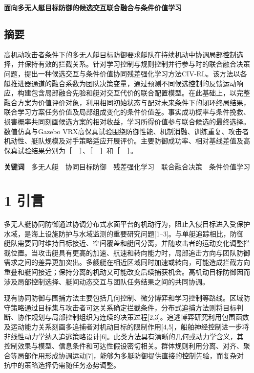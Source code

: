 \documentclass[
  11pt,
  fontset=none]{ctexart}
\author{}
\date{}
\begin{document}
\begin{center}
{\LARGE\bfseries 面向多无人艇目标防御的候选交互联合融合与条件价值学习\par}
\vspace{5mm}
\end{center}

\subsection{摘要}\label{ux6458ux8981}

高机动攻击者条件下的多无人艇目标防御要求艇队在持续机动中协调局部控制选择，并保持有效的拦截关系。针对学习控制与规则控制并行参与时的联合融合决策问题，提出一种候选交互与条件价值协同残差强化学习方法CIV-RL。该方法以各艇推进器通道的融合系数为团队决策变量，通过预测不同候选控制的反馈运动响应，构建包含局部融合先验和艇对交互代价的联合配置模型。在此基础上，以完整融合方案为价值评价对象，利用相同初始状态与配对未来条件下的闭环终局结果，联合学习方案任务价值及局部组成变化的条件价值差。事实成功概率与条件挽救、损害概率共同刻画候选方案的相对收益，学习所得价值参与联合候选的最终选择。数值仿真与Gazebo
VRX高保真试验围绕防御性能、机制消融、训练重复、攻击者机动性、艇队规模及对手策略适应开展评价。主要防御成功率、相对基线差值及高保真试验结果分别为［　］、［　］和［　］。

\textbf{关键词}　多无人艇　协同目标防御　残差强化学习　联合融合决策　条件价值学习

\section{1 引言}\label{ux5f15ux8a00}

多无人艇协同防御通过协调分布式水面平台的机动行为，阻止入侵目标进入受保护水域，是海上设施防护与水域监测的重要研究问题{[}1--3{]}。与单艇追踪相比，防御艇队需要同时维持目标接近、空间覆盖和艇间分离，并随攻击者的运动变化调整拦截位置。当攻击艇具有更高的加速、航速和转向能力时，局部追击方向与团队防御需求之间的差异更加突出。多艘艇在相近区域同时加速或转向，可能造成拦截方向重叠和艇间接近；保持分离的机动又可能改变后续捕获机会。高机动目标防御因而涉及局部控制选择、艇间动态交互与团队任务结果之间的共同协调。

现有协同防御与围捕方法主要包括几何控制、微分博弈和学习控制等路线。区域防守策略通过目标集与攻击者可达关系确定拦截条件，分布式追捕方法则将目标判断、协作规划与局部控制组织为连续的决策过程{[}2,3{]}。追逃博弈研究利用包围函数及运动能力关系刻画多追捕者对机动目标的限制作用{[}4,5{]}，船舶神经控制进一步将非线性动力学纳入追逃策略设计{[}6{]}。此类方法具有清晰的几何或动力学含义，其控制效果与模型、信息条件和可达性假设密切相关。群体规则利用分离、对齐、聚合等局部作用形成协调运动{[}7{]}，能够为多艇防御提供直接的控制先验，而复杂对抗中的策略选择仍需随任务态势调整。
\end{document}
